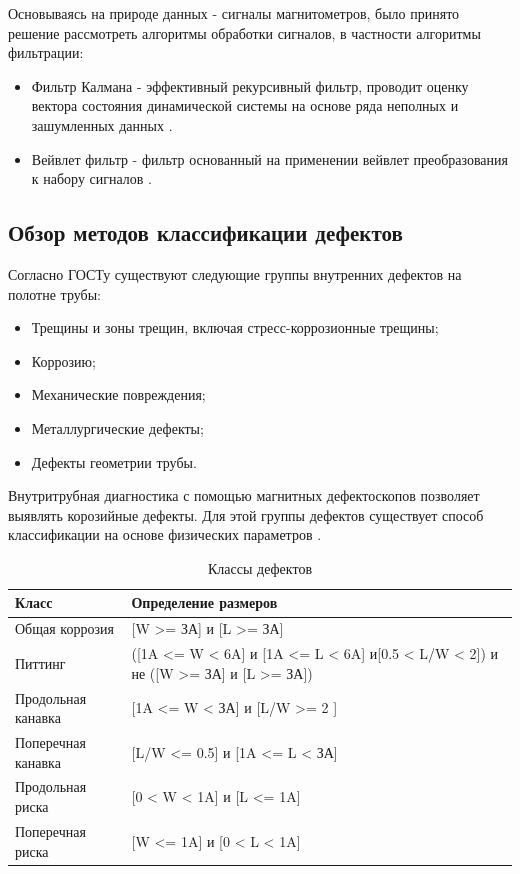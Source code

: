 \documentclass[a4paper,article,14pt]{extarticle}
\begin{document}
Основываясь на природе данных - сигналы магнитометров, было принято решение рассмотреть алгоритмы  обработки сигналов, в частности алгоритмы фильтрации:

\begin{itemize}
    \item Фильтр Калмана - эффективный рекурсивный фильтр, проводит оценку вектора состояния динамической системы 
    на основе ряда неполных и зашумленных данных \cite{a11}.
    \item Вейвлет фильтр - фильтр основанный на применении вейвлет преобразования к набору сигналов \cite{a12}.
\end{itemize}

\subsection{Обзор методов классификации дефектов}

Согласно ГОСТу \cite{g1} существуют следующие группы  внутренних дефектов на полотне трубы:

\begin{itemize}
    \item Трещины и зоны трещин, включая стресс-коррозионные трещины;
    \item Коррозию;
    \item Механические повреждения;
    \item Металлургические дефекты;
    \item Дефекты геометрии трубы.
\end{itemize}

Внутритрубная диагностика с помощью магнитных дефектоскопов позволяет выявлять корозийные дефекты.
Для этой группы дефектов существует способ классификации на основе физических 
параметров \cite{g2}.

\begin{center}
    \begin{longtable}{|p{5cm}|p{7cm}|}
        \caption{Классы дефектов}\\\hline
        Класс & Определение размеров \\ \hline
        Общая коррозия & [W >= ЗА] и [L >= ЗА] \\ \hline
        Питтинг & ([1A <= W < 6A] и [1A <= L < 6A] и[0.5 < L/W < 2]) и не ([W >= ЗА] и [L >= ЗА]) \\ \hline
        Продольная канавка & [1A <= W < ЗА] и [L/W >= 2 ] \\ \hline
        Поперечная канавка & [L/W <= 0.5] и [1A <= L < ЗА] \\ \hline
        Продольная риска & [0 < W < 1A] и [L <= 1A] \\ \hline
        Поперечная риска & [W <= 1A] и [0 < L < 1A] \\ \hline
    \end{longtable}
\end{center}
\end{document}
